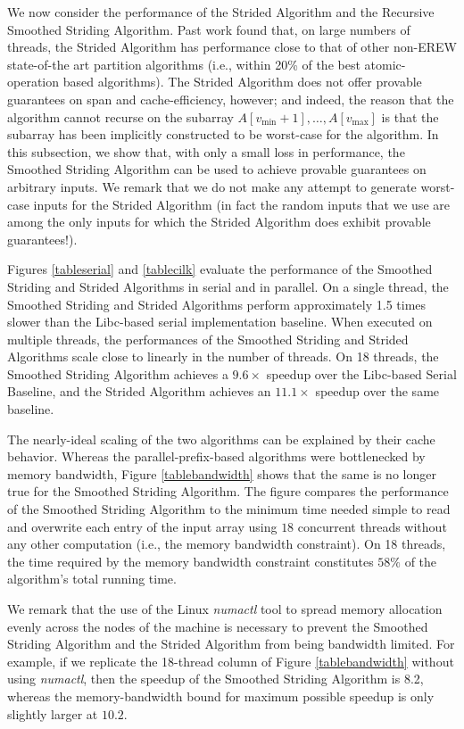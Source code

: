 \documentclass[11pt]{article}
\renewcommand{\paragraph}[1]{\vspace{0.09in}\noindent{\bf \boldmath #1.}}
\theoremstyle{remark}
\theoremstyle{remark}
\begin{document}
We now consider the performance of the Strided Algorithm
and the Recursive Smoothed Striding Algorithm. Past work
\cite{Frias08} found that, on large numbers of threads, the Strided
Algorithm has performance close to that of other non-EREW state-of-the
art partition algorithms (i.e., within 20\% of the best
atomic-operation based algorithms). The Strided Algorithm does not
offer provable guarantees on span and cache-efficiency, however; and
indeed, the reason that the algorithm cannot recurse on the subarray
$A[v_{\text{min}} + 1], \ldots, A[v_{\text{max}}]$ is that the subarray has been
implicitly constructed to be worst-case for the algorithm. In this
subsection, we show that, with only a small loss in performance, the
Smoothed Striding Algorithm can be used to achieve provable guarantees
on arbitrary inputs. We remark that we do not make any attempt to
generate worst-case inputs for the Strided Algorithm (in fact the
random inputs that we use are among the only inputs for which the
Strided Algorithm does exhibit provable guarantees!).

Figures \ref{tableserial} and \ref{tablecilk} evaluate the performance
of the Smoothed Striding and Strided Algorithms in serial and in
parallel. On a single thread, the Smoothed Striding and Strided
Algorithms perform approximately 1.5 times slower than the Libc-based
serial implementation baseline. When executed on multiple threads, the
performances of the Smoothed Striding and Strided Algorithms scale
close to linearly in the number of threads. On 18 threads, the
Smoothed Striding Algorithm achieves a $9.6 \times $ speedup over the
Libc-based Serial Baseline, and the Strided Algorithm achieves an
$11.1 \times$ speedup over the same baseline.

The nearly-ideal scaling of the two algorithms can be explained by
their cache behavior. Whereas the parallel-prefix-based algorithms
were bottlenecked by memory bandwidth, Figure \ref{tablebandwidth}
shows that the same is no longer true for the Smoothed Striding
Algorithm. The figure compares the performance of the Smoothed
Striding Algorithm to the minimum time needed simple to read and overwrite
each entry of the input array using $18$ concurrent threads without any other
computation (i.e., the memory bandwidth constraint). On 18 threads, the time required by the memory bandwidth
constraint constitutes $58\%$ of the algorithm's total running time.

\paragraph{NUMA Effects}
We remark that the use of the Linux \emph{numactl} tool \cite{Kleen05}
to spread memory allocation evenly across the nodes of the machine is
necessary to prevent the Smoothed Striding Algorithm and the Strided
Algorithm from being bandwidth limited. For example, if we replicate
the 18-thread column of Figure \ref{tablebandwidth} without using
\emph{numactl}, then the speedup of the Smoothed Striding Algorithm is
8.2, whereas the memory-bandwidth bound for maximum possible speedup
is only slightly larger at $10.2$.
\end{document}
